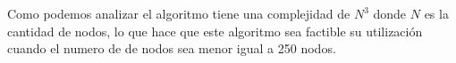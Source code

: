 Como podemos analizar el algoritmo tiene una complejidad de $N^{3}$ donde $N$ es la cantidad de nodos, lo que hace que este algoritmo sea factible su utilización cuando el numero de de nodos sea menor igual a 250 nodos.